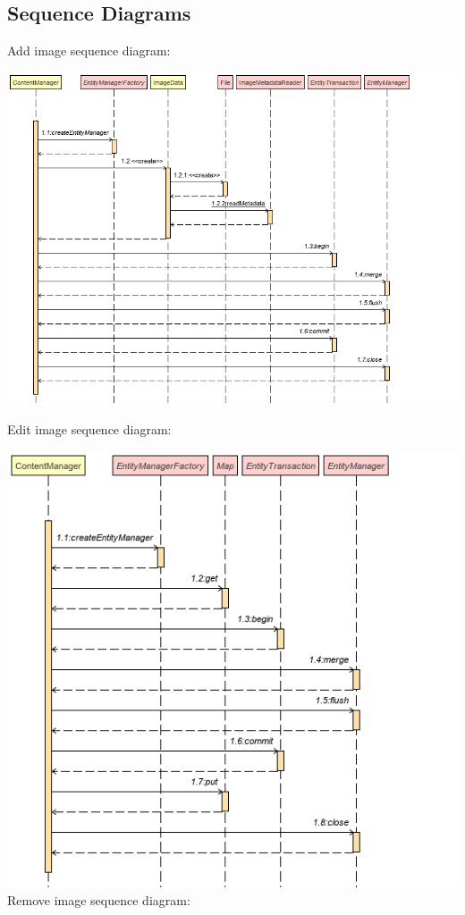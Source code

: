 \documentclass{article}
\begin{document}
\subsection{Sequence Diagrams}
\begin{center}
    Add image sequence diagram:
    \newline    
    
    \includegraphics[scale=0.5]{./Images/add-image-sequence-diagram.png}
    \newline
    
    Edit image sequence diagram:
    \newline
    
    \includegraphics[scale=0.5]{./Images/edit-image-sequence-diagram.png}
    \newpage
    Remove image sequence diagram:
    \newline
    

\end{center}
\end{document}
